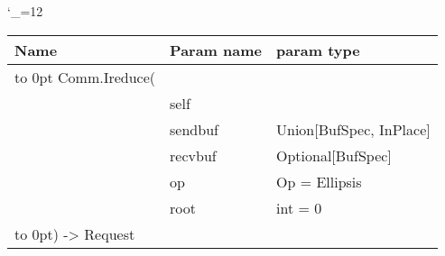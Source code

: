 \begingroup \catcode`\_=12 \tt
\begin{tabular}{lll}
\toprule
\textrm{Name}&\textrm{Param name}&\textrm{param type}\\
\midrule
\hbox to 0pt {Comm.Ireduce(\hss}\\
& self\\
& sendbuf & Union[BufSpec, InPlace]\\
& recvbuf & Optional[BufSpec]\\
& op & Op = Ellipsis\\
& root & int = 0\\
\hbox to 0pt{) -> Request\hss}\\
\bottomrule
\end{tabular}
\endgroup
